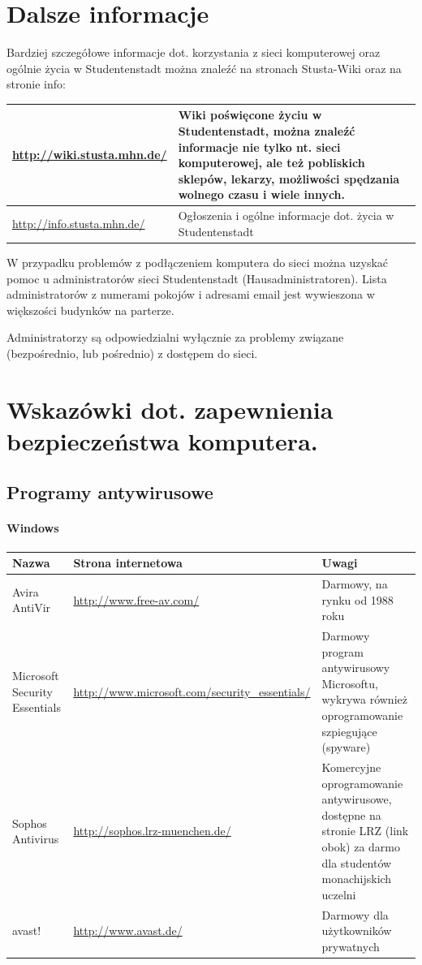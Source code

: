 \documentclass[a4paper,12pt]{scrartcl}
\begin{document}
\section*{Dalsze informacje}

Bardziej szczegółowe informacje dot. korzystania z sieci komputerowej oraz ogólnie życia w Studentenstadt można znaleźć na stronach Stusta-Wiki oraz na stronie info:

\begin{center}
  \begin{tabularx}{\linewidth}{|lX|}
    \hline
    \url{http://wiki.stusta.mhn.de/} & Wiki poświęcone życiu w Studentenstadt, można znaleźć informacje nie tylko nt. sieci komputerowej, ale też pobliskich sklepów, lekarzy, możliwości spędzania wolnego czasu i wiele innych.\\
    \hline
    \url{http://info.stusta.mhn.de/} & Ogłoszenia i ogólne informacje dot. życia w Studentenstadt\\
    \hline
  \end{tabularx}
\end{center}
W przypadku problemów z podłączeniem komputera do sieci można uzyskać pomoc u administratorów sieci Studentenstadt (Hausadministratoren). Lista administratorów z numerami pokojów i adresami email jest wywieszona w większości budynków na parterze. 

Administratorzy są odpowiedzialni wyłącznie za problemy związane (bezpośrednio, lub pośrednio) z dostępem do sieci.

\newpage
\enlargethispage{20pt}
\section*{Wskazówki dot. zapewnienia bezpieczeństwa komputera.}

\subsection*{Programy antywirusowe}
\paragraph*{Windows}
\begin{center}
  \begin{tabularx}{\linewidth}{|p{.2\linewidth}XX|}
    \hline
    Nazwa & Strona internetowa & Uwagi\\
    \hline \hline
    Avira AntiVir & \url{http://www.free-av.com/} & Darmowy, na rynku od 1988 roku\\
    \hline
    Microsoft Security Essentials & \url{http://www.microsoft.com/security\_essentials/} & Darmowy program antywirusowy Microsoftu, wykrywa również oprogramowanie szpiegujące (spyware)\\
    \hline
    Sophos Antivirus & \url{http://sophos.lrz-muenchen.de/} & Komercyjne oprogramowanie antywirusowe, dostępne na stronie LRZ (link obok) za darmo dla studentów monachijskich uczelni\\
    \hline
    avast! & \url{http://www.avast.de/} & Darmowy dla użytkowników prywatnych\\
    \hline
  \end{tabularx}
\end{center}
\end{document}
